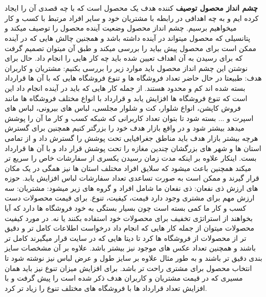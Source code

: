 \documentclass[12pt,a4paper]{article}
\begin{document}
 
 \maketitle
 

	
	
	\section{} \label {section.productVision}
	\textbf{چشم انداز محصول توصیف} کننده هدف یک محصول است که با چه قصدی آن را ایجاد کرده ایم و به چه اهدافی در رابطه با مشتریان خود و سایر افراد مرتبط با کسب و کار میخواهیم برسیم. چشم انداز محصول وضعیت آینده محصول را توصیف میکند و پتانسیلی که محصول میتواند در آینده داشته باشد و همجنین چالش هایی که در آینده ممکن است برای محصول پیش بیاید را بررسی میکند و طبق آن میتوان تصمیم گرفت که برای رسیدن به آن اهداف تعیین شده باید چه کار هایی را انجام داد.
	حال برای نوشتن این چشم انداز محصول باید موارد زیر را بررسی بکنیم:
	مشتریان و کاربران هدف:
	طبیعتا در حال حاضر تعداد فروشگاه ها و تنوع فروشگاه هایی که با آن ها قرارداد بسته شده اند کم و محدود هستند. از جمله کار هایی که باید در آینده انجام داد این است که تنوع فروشگاه ها افزایش یابد و قرارداد با انواع مختلف فروشگاه ها مانند فروش کاپشن، انواع شلوار، کت و شلوار مجلسی، لباس های بیرونی، لباس های اسپرت و ... بسته شود تا بتوان تعداد کاربرانی که شبکه کسب و کار ما آن را پوشش میدهد بیشتر شود و در واقع بازار هدف خود را بزرگتر کنیم
	همچنین برای گسترش هرچه بیشتر بازار هدف باید مناطق جغرافیایی تحت پوشش را گسترش داد و از تمامی استان ها و شهر های بزرگشان چندین مغازه را تحت پوشش قرار داد و با آن ها قرارداد بست.
	اینکار علاوه بر اینکه مدت زمان رسیدن یکسری از سفارشات خاص را سریع تر میکند همچنین باعث میشود که سلایق افراد مختلف استان ها نیز همگی در یک مکان قرار گیرند و ممکن است به صورت تساعدی تعداد سفارشات لباس افزایش یابد.
	حوزه های ارزش ذی نفعان:
	ذی نفعان ما شامل افراد و گروه های زیر میشود:
	مشتریان: سه ارزش مهم برای مشتری وجود دارد قیمت، کیفیت، تنوع. برای قیمت محصولات دست کسب و کار ما کمی بسته است چون بسیار بستگی به خود فروشگاه ها دارد که آیا بخواهند از استراتژی تخفیف برای محصولات خود استفاده بکنند یا نه.
	در مورد کیفیت محصولات میتوان از جمله کار هایی که انجام داد درخواست اطلاعات کامل تر و دقیق تر از محصولات از فروشگاه ها کرد تا دیتا هایی که در سایت قرار میگیرند کامل تر باشند و همچنین تعداد عکس های موجود نیز بیشتر باشد. علاوه بر آن مشخصات سایز بندی دقیق تر باشند و به طور مثال علاوه بر سایز طول و عرض لباس نیز نوشته شود تا انتخاب محصول برای مشتری راحت تر باشد.
	برای افزایش میزان تنوع نیز باید همان مسیری که در قیمت مشتریان و کاربران هدف ذکر شده است را پیش گرفت و با افزایش تعداد قرارداد ها با فروشگاه های مختلف تنوع را زیاد تر کرد.
\end{document}
